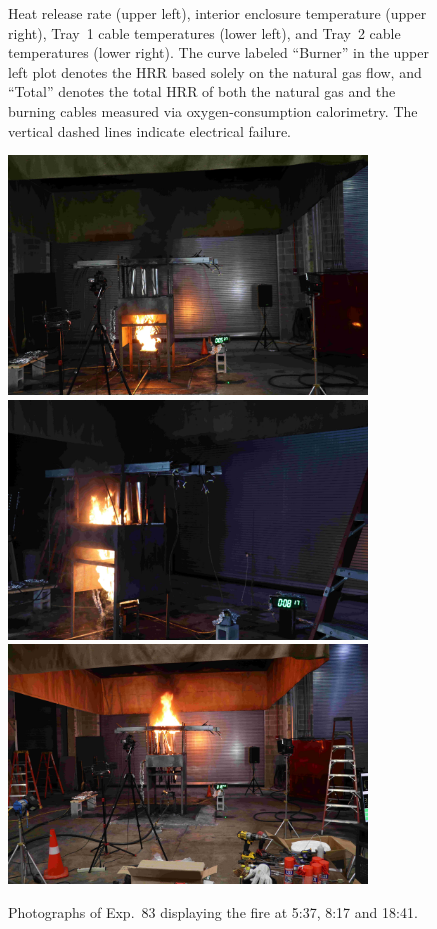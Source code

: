 \begin{figure}[H]
\caption[HRR and temperatures of Exp.~83]{Heat release rate (upper left), interior enclosure temperature (upper right), Tray~1 cable temperatures (lower left), and Tray~2 cable temperatures (lower right). The curve labeled ``Burner'' in the upper left plot denotes the HRR based solely on the natural gas flow, and ``Total'' denotes the total HRR of both the natural gas and the burning cables measured via oxygen-consumption calorimetry. The vertical dashed lines indicate electrical failure.}
\label{fig:Test_83}
\end{figure}

\begin{figure}[p]
\centering
\includegraphics[height=2.50in]{../FIGURES/Test_83_Photo_1} \\ \vspace{0.1in}
\includegraphics[height=2.50in]{../FIGURES/Test_83_Photo_2} \\ \vspace{0.1in}
\includegraphics[height=2.50in]{../FIGURES/Test_83_Photo_3}
\caption[Photographs of Exp.~83]{Photographs of Exp.~83 displaying the fire at 5:37, 8:17 and 18:41.}
\label{fig:Test_83_photos}
\end{figure}


